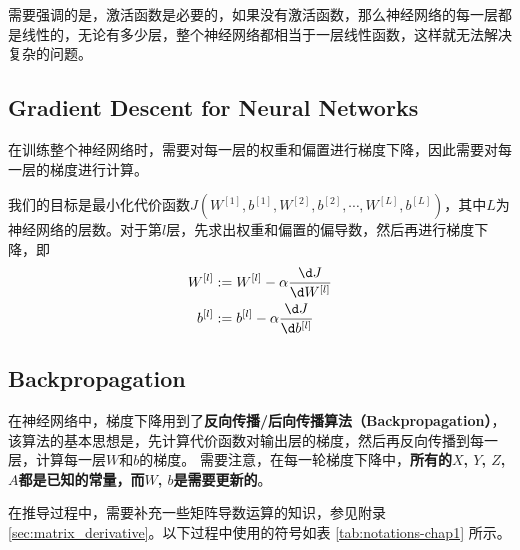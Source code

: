 需要强调的是，激活函数是必要的，如果没有激活函数，那么神经网络的每一层都是线性的，无论有多少层，整个神经网络都相当于一层线性函数，这样就无法解决复杂的问题。

\subsection{Gradient Descent for Neural Networks}
在训练整个神经网络时，需要对每一层的权重和偏置进行梯度下降，因此需要对每一层的梯度进行计算。

我们的目标是最小化代价函数$J(W^{[1]}, b^{[1]}, W^{[2]}, b^{[2]}, \cdots, W^{[L]}, b^{[L]})$，其中$L$为神经网络的层数。对于第$l$层，先求出权重和偏置的偏导数，然后再进行梯度下降，即
\begin{equation}
    \begin{aligned}
        W^{[l]} &:= W^{[l]} - \alpha \frac{\d J}{\d W^{[l]}} \\
        b^{[l]} &:= b^{[l]} - \alpha \frac{\d J}{\d b^{[l]}}
    \end{aligned}
\end{equation}

\subsection{Backpropagation}
在神经网络中，梯度下降用到了\textbf{反向传播/后向传播算法（Backpropagation）}，该算法的基本思想是，先计算代价函数对输出层的梯度，然后再反向传播到每一层，计算每一层$W$和$b$的梯度。
需要注意，在每一轮梯度下降中，\textbf{所有的$X$, $Y$, $Z$, $A$都是已知的常量，而$W$, $b$是需要更新的}。

在推导过程中，需要补充一些矩阵导数运算的知识，参见附录 \ref{sec:matrix_derivative}。以下过程中使用的符号如表 \ref{tab:notations-chap1} 所示。

